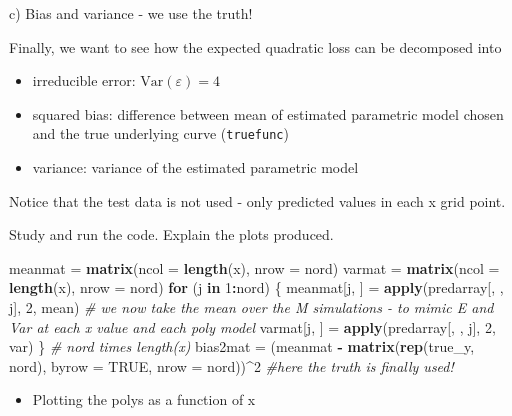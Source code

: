 \documentclass[ignorenonframetext,]{beamer}
\newenvironment{Shaded}{\begin{snugshade}}{\end{snugshade}}
\newcommand{\KeywordTok}[1]{\textcolor[rgb]{0.13,0.29,0.53}{\textbf{#1}}}
\newcommand{\DataTypeTok}[1]{\textcolor[rgb]{0.13,0.29,0.53}{#1}}
\newcommand{\DecValTok}[1]{\textcolor[rgb]{0.00,0.00,0.81}{#1}}
\newcommand{\StringTok}[1]{\textcolor[rgb]{0.31,0.60,0.02}{#1}}
\newcommand{\CommentTok}[1]{\textcolor[rgb]{0.56,0.35,0.01}{\textit{#1}}}
\newcommand{\OtherTok}[1]{\textcolor[rgb]{0.56,0.35,0.01}{#1}}
\newcommand{\ControlFlowTok}[1]{\textcolor[rgb]{0.13,0.29,0.53}{\textbf{#1}}}
\newcommand{\OperatorTok}[1]{\textcolor[rgb]{0.81,0.36,0.00}{\textbf{#1}}}
\newcommand{\NormalTok}[1]{#1}
\providecommand{\tightlist}{%
  \setlength{\itemsep}{0pt}\setlength{\parskip}{0pt}}
\begin{document}
\begin{frame}[fragile]

\begin{block}{c) Bias and variance - we use the truth!}

Finally, we want to see how the expected quadratic loss can be
decomposed into

\begin{itemize}
\tightlist
\item
  irreducible error: \(\text{Var}(\varepsilon)=4\)
\item
  squared bias: difference between mean of estimated parametric model
  chosen and the true underlying curve (\texttt{truefunc})
\item
  variance: variance of the estimated parametric model
\end{itemize}

Notice that the test data is not used - only predicted values in each x
grid point.

Study and run the code. Explain the plots produced.

\begin{Shaded}
\begin{Highlighting}[]
\NormalTok{meanmat =}\StringTok{ }\KeywordTok{matrix}\NormalTok{(}\DataTypeTok{ncol =} \KeywordTok{length}\NormalTok{(x), }\DataTypeTok{nrow =}\NormalTok{ nord)}
\NormalTok{varmat =}\StringTok{ }\KeywordTok{matrix}\NormalTok{(}\DataTypeTok{ncol =} \KeywordTok{length}\NormalTok{(x), }\DataTypeTok{nrow =}\NormalTok{ nord)}
\ControlFlowTok{for}\NormalTok{ (j }\ControlFlowTok{in} \DecValTok{1}\OperatorTok{:}\NormalTok{nord) \{}
\NormalTok{    meanmat[j, ] =}\StringTok{ }\KeywordTok{apply}\NormalTok{(predarray[, , j], }\DecValTok{2}\NormalTok{, mean)  }\CommentTok{# we now take the mean over the M simulations - to mimic E and Var at each x value and each poly model}
\NormalTok{    varmat[j, ] =}\StringTok{ }\KeywordTok{apply}\NormalTok{(predarray[, , j], }\DecValTok{2}\NormalTok{, var)}
\NormalTok{\}}
\CommentTok{# nord times length(x)}
\NormalTok{bias2mat =}\StringTok{ }\NormalTok{(meanmat }\OperatorTok{-}\StringTok{ }\KeywordTok{matrix}\NormalTok{(}\KeywordTok{rep}\NormalTok{(true_y, nord), }\DataTypeTok{byrow =} \OtherTok{TRUE}\NormalTok{, }\DataTypeTok{nrow =}\NormalTok{ nord))}\OperatorTok{^}\DecValTok{2}  \CommentTok{#here the truth is finally used!}
\end{Highlighting}
\end{Shaded}

\begin{itemize}
\tightlist
\item
  Plotting the polys as a function of x
\end{itemize}


\end{block}
\end{frame}
\end{document}
